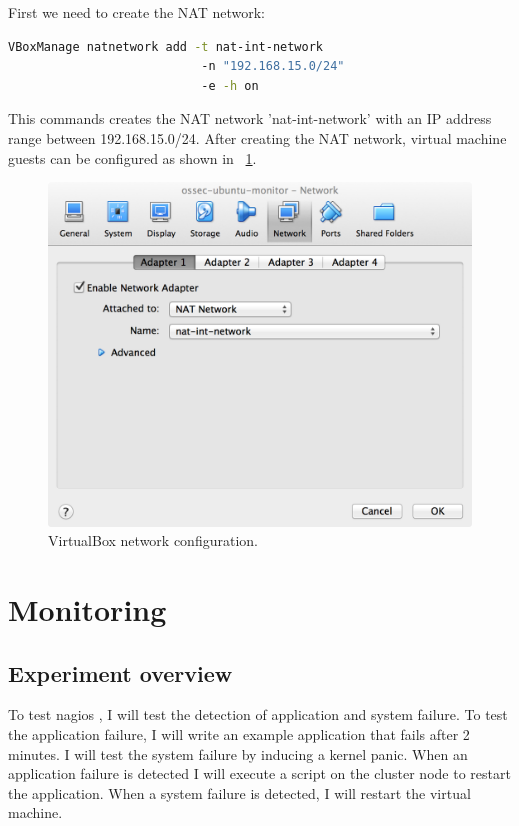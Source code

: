 \documentclass[12pt]{report}
\begin{document}
\noindent First we need to create the NAT network:
\begin{lstlisting}[language=bash]
 VBoxManage natnetwork add -t nat-int-network 
                           -n "192.168.15.0/24"
                           -e -h on
\end{lstlisting}
This commands creates the NAT network 'nat-int-network' with an IP
address range between 192.168.15.0/24.
After creating the NAT network, virtual machine guests can be
configured as shown in ~\cref{fig:vbox_network_config}.
\begin{figure}[h!]
  \caption{VirtualBox network configuration.}
  \label{fig:vbox_network_config}
  \centering
    \includegraphics[scale=0.3]{pics/vbox_network_config.png}
\end{figure}


\section{Monitoring}
\subsection{Experiment overview}
To test nagios \cite{nagios:2013}, I will test the detection of
application and system failure. To test the application failure, I
will write an example application that fails after
2 minutes. I will test the system failure by inducing a kernel panic.
When an application failure is detected I will execute a script on the
cluster node to restart the application.
When a system failure is detected, I will restart the virtual
machine. 
\end{document}
